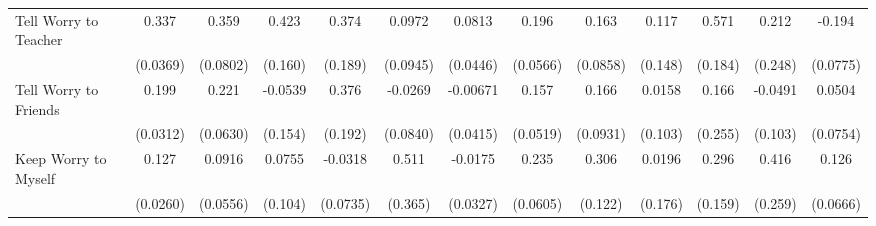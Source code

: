 {\begin{tabular}{l*{12}{c}}
\addlinespace
Tell Worry to Teacher&       0.337\sym{***}&       0.359\sym{***}&       0.423\sym{**} &       0.374\sym{*}  &      0.0972         &      0.0813         &       0.196\sym{***}&       0.163         &       0.117         &       0.571\sym{**} &       0.212         &      -0.194\sym{*}  \\
            &    (0.0369)         &    (0.0802)         &     (0.160)         &     (0.189)         &    (0.0945)         &    (0.0446)         &    (0.0566)         &    (0.0858)         &     (0.148)         &     (0.184)         &     (0.248)         &    (0.0775)         \\
\addlinespace
Tell Worry to Friends&       0.199\sym{***}&       0.221\sym{***}&     -0.0539         &       0.376         &     -0.0269         &    -0.00671         &       0.157\sym{**} &       0.166         &      0.0158         &       0.166         &     -0.0491         &      0.0504         \\
            &    (0.0312)         &    (0.0630)         &     (0.154)         &     (0.192)         &    (0.0840)         &    (0.0415)         &    (0.0519)         &    (0.0931)         &     (0.103)         &     (0.255)         &     (0.103)         &    (0.0754)         \\
\addlinespace
Keep Worry to Myself&       0.127\sym{***}&      0.0916         &      0.0755         &     -0.0318         &       0.511         &     -0.0175         &       0.235\sym{***}&       0.306\sym{*}  &      0.0196         &       0.296         &       0.416         &       0.126         \\
            &    (0.0260)         &    (0.0556)         &     (0.104)         &    (0.0735)         &     (0.365)         &    (0.0327)         &    (0.0605)         &     (0.122)         &     (0.176)         &     (0.159)         &     (0.259)         &    (0.0666)         \\
\bottomrule
\end{tabular}
}
